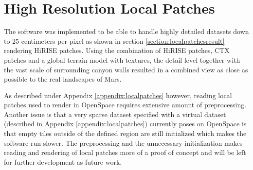 \section{High Resolution Local Patches}
The software was implemented to be able to handle highly detailed datasets down to 25 centimeters per pixel as shown in section \ref{section:localpatchesresult} rendering HiRISE patches. Using the combination of HiRISE patches, CTX patches and a global terrain model with textures, the detail level together with the vast scale of surrounding canyon walls resulted in a combined view as close as possible to the real landscapes of Mars.

As described under Appendix \ref{appendix:localpatches} however, reading local patches used to render in OpenSpace requires extensive amount of preprocessing. Another issue is that a very sparse dataset specified with a virtual dataset (described in Appendix \ref{appendix:localpatches}) currently poses on OpenSpace is that empty tiles outside of the defined region are still initialized which makes the software run slower. The preprocessing and the unnecessary initialization makes reading and rendering of local patches more of a proof of concept and will be left for further development as future work.